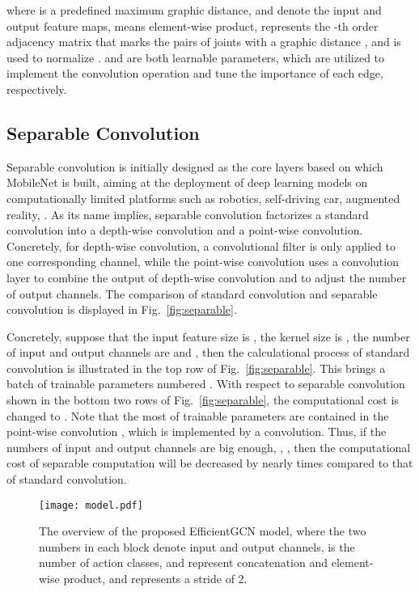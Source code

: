 \documentclass[10pt,journal,compsoc]{IEEEtran}
\begin{document}
where  is a predefined maximum graphic distance,  and  denote the input and output feature maps,  means element-wise product,  represents the -th order adjacency matrix that marks the pairs of joints with a graphic distance , and  is used to normalize .  and  are both learnable parameters, which are utilized to implement the convolution operation and tune the importance of each edge, respectively.

\subsection{Separable Convolution}
\label{ssec:sepconv}

Separable convolution is initially designed as the core layers based on which MobileNet \cite{howard2017mobilenets} is built, aiming at the deployment of deep learning models on computationally limited platforms such as robotics, self-driving car, augmented reality, \etc. As its name implies, separable convolution factorizes a standard convolution into a depth-wise convolution and a point-wise convolution. Concretely, for depth-wise convolution, a convolutional filter is only applied to one corresponding channel, while the point-wise convolution uses a  convolution layer to combine the output of depth-wise convolution and to adjust the number of output channels. The comparison of standard convolution and separable convolution is displayed in Fig.~\ref{fig:separable}.

Concretely, suppose that the input feature size is , the kernel size is , the number of input and output channels are  and , then the calculational process of standard convolution is illustrated in the top row of Fig.~\ref{fig:separable}. This brings a batch of trainable parameters numbered . With respect to separable convolution shown in the bottom two rows of Fig.~\ref{fig:separable}, the computational cost is changed to . Note that the most of trainable parameters are contained in the point-wise convolution \cite{howard2017mobilenets}, which is implemented by a  convolution. Thus, if the numbers of input and output channels are big enough, \eg, , then the computational cost of separable computation will be decreased by nearly  times compared to that of standard convolution.

\begin{figure}[t]
  \vspace{-0.2cm}
  \centerline{\texttt{[image: model.pdf]}}
  \vspace{-0.4cm}
  \caption{The overview of the proposed EfficientGCN model, where the two numbers in each block denote input and output channels,  is the number of action classes,  and  represent concatenation and element-wise product, and  represents a stride of 2. \bv}\label{fig:model}
  \vspace{-0.4cm}
\end{figure}
\end{document}
